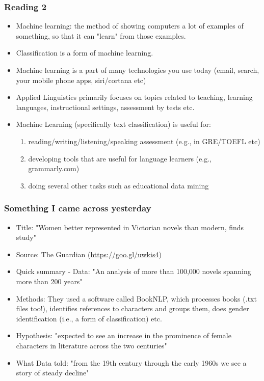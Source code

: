 \documentclass{beamer}
\begin{document}
\begin{frame}
\frametitle{Reading 2}
\begin{itemize}
\item Machine learning: the method of showing computers a lot of examples of something, so that it can "learn" from those examples. \pause
\item Classification is a form of machine learning. \pause
\item Machine learning is a part of many technologies you use today (email, search, your mobile phone apps, siri/cortana etc) \pause
\item Applied Linguistics primarily focuses on topics related to teaching, learning languages, instructional settings, assessment by tests etc. 
\item Machine Learning (specifically text classification) is useful for:
\begin{enumerate}
\item reading/writing/listening/speaking assessment (e.g., in GRE/TOEFL etc)
\item developing tools that are useful for language learners (e.g., grammarly.com)
\item doing several other tasks such as educational data mining
\end{enumerate}
\end{itemize}
\end{frame}

\begin{frame}
\frametitle{Something I came across yesterday}
\begin{itemize}
\item Title: "Women better represented in Victorian novels than modern, finds study"
\item Source: The Guardian (\url{https://goo.gl/uwkis4})
\item Quick summary - Data: "An analysis of more than 100,000 novels spanning more than 200 years"
\item Methods: They used a software called BookNLP, which processes books (.txt files too!), identifies references to characters and groups them, does gender identification (i.e., a form of classification) etc.
\item Hypothesis: "expected to see an increase in the prominence of female characters in literature across the two centuries"
\item What Data told: "from the 19th century through the early 1960s we see a story of steady decline"
\end{itemize}
\end{frame}
\end{document}
